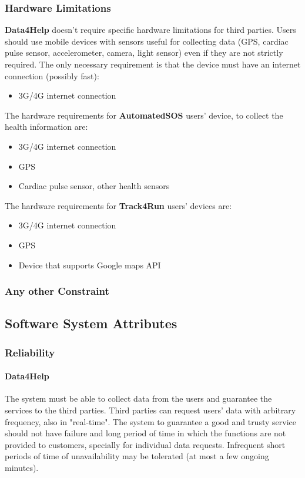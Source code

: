 \documentclass[a4paper]{article}
\begin{document}
    \subsubsection{Hardware Limitations}
 \textbf{Data4Help} doesn't require specific hardware limitations for third parties. Users should use mobile devices with sensors useful for collecting data (GPS, cardiac pulse sensor, accelerometer, camera, light sensor) even if they are not strictly required. The only necessary requirement is that the device must have an internet connection (possibly fast):
    \begin{itemize}
        \item 3G/4G internet connection
    \end{itemize}
    
\noindent The hardware requirements for \textbf{AutomatedSOS} users' device, to collect the health information are:
    \begin{itemize}
        \item 3G/4G internet connection
        \item GPS
        \item Cardiac pulse sensor, other health sensors
    \end{itemize}
\noindent The hardware requirements for \textbf{Track4Run} users' devices are:
    \begin{itemize}
        \item 3G/4G internet connection
        \item GPS
        \item Device that supports Google maps API
    \end{itemize}
    
    \subsubsection{Any other Constraint}
    
    
    
    \subsection{Software System Attributes}
    
    \subsubsection{Reliability} 
    
    \paragraph{Data4Help} The system must be able to collect data from the users and guarantee the services to the third parties.
    Third parties can request users' data with arbitrary frequency, also in "real-time". The system to guarantee a good and trusty service should not have failure and long period of time in which the functions are not provided to customers, specially for individual data requests. Infrequent short periods of time of unavailability may be tolerated (at most a few ongoing minutes).
    
\end{document}
